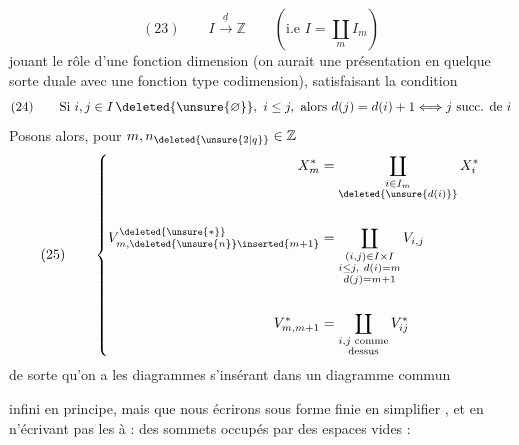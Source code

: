 \[
(23)\qquad I\xrightarrow{\underline{d}}\mathbb Z
\qquad (\text{i.e } I=\coprod_m I_m)
\]
jouant le rôle d'une fonction dimension
(on aurait une présentation en quelque sorte
duale avec une fonction type codimension),
satisfaisant la condition
\[
(24)\qquad\text{Si }i,j\in I\,\deleted{\unsure{\varnothing}},\ i\leq j,\text{ alors }d(j)=d(i)+1\Longleftrightarrow j\text{ succ. de }i
\]
Posons alors, pour $m,n_{\deleted{\unsure{2|q}}}\in\mathbb Z$
\[
(25)\qquad\left\{\begin{aligned}
X_m^*&=\coprod_{\substack{i\in I_m\\\deleted{\unsure{d(i)}}}}X_i^*\\[1.5em]
V_{m,\deleted{\unsure{n}}\inserted{m+1}}^{\deleted{\unsure{*}}}&=\coprod_{\substack{(i,j)\in I\times I\\i\leq j,\ d(i)=m\\d(j)=m+1}}V_{i,j}\\[1.5em]
V_{m,m+1}^*&=\coprod_{\substack{i,j\text{ comme}\\\text{dessus}}}V_{ij}^*
\end{aligned}\right.
\]
de sorte qu'on a les diagrammes
s'insérant dans un diagramme commun %

infini en principe, mais que nous
écrirons sous forme finie en 
simplifier ,  et en n'écrivant pas les
   à : des
sommets occupés par des espaces vides :
